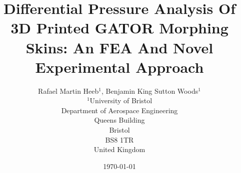 \usepackage[margin=25mm]{geometry}
\usepackage[numbers]{natbib}
\usepackage{amsmath}
\usepackage{amsfonts}
\usepackage{amssymb}
\usepackage{graphicx}
\usepackage{verbatim}
\immediate{}

\providecommand{\keywords}[1]
{
  \small	
  \textbf{\textit{Keywords---}} #1
}

\title{Differential Pressure Analysis Of 3D Printed GATOR Morphing Skins: An FEA And Novel Experimental Approach}
\author{Rafael Martin Heeb$^{1}$, Benjamin King Sutton Woods$^{1}$  \\
        \small $^{1}$University of Bristol\\
        \small Department of Aerospace Engineering\\
        \small Queens Building\\
        \small Bristol\\
        \small BS8 1TR\\
        \small United Kingdom \\
}
\date{\today} %